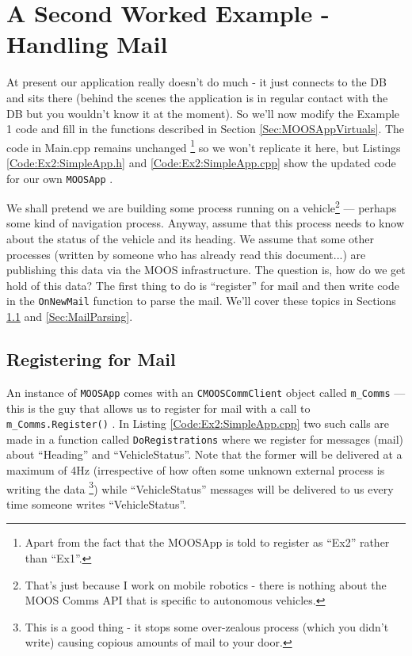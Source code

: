 \documentclass[a4paper,10pt]{article}
\newcommand{\Code}[1]{\texttt{#1} }
\newcommand{\code}[1]{\Code{#1} }
\begin{document}
\section{A Second Worked Example - Handling Mail}

At present our application really doesn't do much - it just
connects to the DB and sits there (behind the scenes the
application is in regular contact with the DB but you wouldn't
know it at the moment). So we'll now modify the Example 1 code
and fill in the functions described in Section
\ref{Sec:MOOSAppVirtuals}. The code in Main.cpp remains unchanged \footnote{Apart from the fact that the MOOSApp is told to register as ``Ex2'' rather than ``Ex1''.}
so we won't replicate it here, but Listings
\ref{Code:Ex2:SimpleApp.h} and \ref{Code:Ex2:SimpleApp.cpp} show
the updated code for our own \code{MOOSApp}.

We shall pretend we are building some process running on a
vehicle\footnote{That's just because I work on mobile robotics -
there is nothing about the MOOS Comms API that is specific to
autonomous vehicles.} --- perhaps some kind of navigation process.
Anyway, assume that this process needs to know about the status of
the vehicle and its heading. We assume that some other processes
(written by someone who has already read this document...) are
publishing this data via the MOOS infrastructure. The question is,
how do we get hold of this data? The first thing to do is
``register'' for mail and then write code in the \code{OnNewMail}
function to parse the mail. We'll cover these topics in Sections
\ref{Sec:Registering} and \ref{Sec:MailParsing}.






\subsection{Registering for Mail}\label{Sec:Registering}

An instance of \code{MOOSApp} comes with an \code{CMOOSCommClient}
object called \code{m\_Comms} --- this is the guy that allows us
to register for mail with a call to \code{m\_Comms.Register()}. In
Listing \ref{Code:Ex2:SimpleApp.cpp} two such calls are made in a
function called \code{DoRegistrations} where we register for
messages (mail) about ``Heading'' and ``VehicleStatus''. Note that
the former will be delivered at  a maximum of 4Hz (irrespective of
how often some unknown external process is writing the data
\footnote{This is a good thing - it stops some over-zealous
process (which you didn't write) causing copious amounts of mail
to your door.}) while ``VehicleStatus'' messages will be delivered
to us every time someone writes ``VehicleStatus''.
\end{document}
